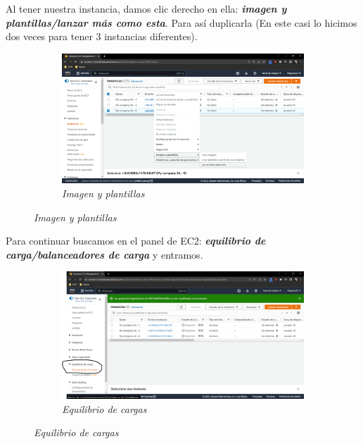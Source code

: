 Al tener nuestra instancia, damos clic derecho en ella:
\textbf{\textit{imagen y plantillas/lanzar más como esta}}. Para así duplicarla
(En este casi lo hicimos dos veces para tener 3 instancias diferentes).

\begin{figure}[H]
    \centering
    \begin{subfigure}[b]{0.8\textwidth}
        \centering
        \includegraphics[width=\textwidth]{Figures/0. General/load_balancer_4.png}
        \caption{\textit{Imagen y plantillas}}
        \label{fig: load balancer 4}
    \end{subfigure}
\end{figure}

Para continuar buscamos en el panel de EC2:
\textbf{\textit{equilibrio de carga/balanceadores de carga}} y entramos.

\begin{figure}[H]
    \centering
    \begin{subfigure}[b]{0.8\textwidth}
        \centering
        \includegraphics[width=\textwidth]{Figures/0. General/load_balancer_5.png}
        \caption{\textit{Equilibrio de cargas}}
        \label{fig: load balancer 5}
    \end{subfigure}
\end{figure}


